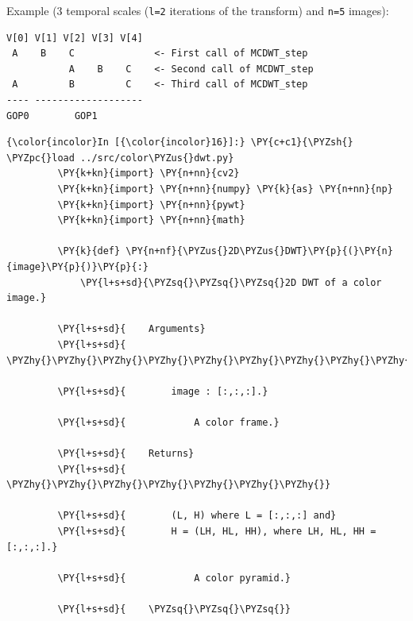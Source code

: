 Example (3 temporal scales (\texttt{l=2} iterations of the transform)
and \texttt{n=5} images):

\begin{verbatim}
V[0] V[1] V[2] V[3] V[4]
 A    B    C              <- First call of MCDWT_step
           A    B    C    <- Second call of MCDWT_step
 A         B         C    <- Third call of MCDWT_step
---- -------------------
GOP0        GOP1
\end{verbatim}

    \begin{Verbatim}[commandchars=\\\{\}]
{\color{incolor}In [{\color{incolor}16}]:} \PY{c+c1}{\PYZsh{} \PYZpc{}load ../src/color\PYZus{}dwt.py}
         \PY{k+kn}{import} \PY{n+nn}{cv2}
         \PY{k+kn}{import} \PY{n+nn}{numpy} \PY{k}{as} \PY{n+nn}{np}
         \PY{k+kn}{import} \PY{n+nn}{pywt}
         \PY{k+kn}{import} \PY{n+nn}{math}
         
         \PY{k}{def} \PY{n+nf}{\PYZus{}2D\PYZus{}DWT}\PY{p}{(}\PY{n}{image}\PY{p}{)}\PY{p}{:}
             \PY{l+s+sd}{\PYZsq{}\PYZsq{}\PYZsq{}2D DWT of a color image.}
         
         \PY{l+s+sd}{    Arguments}
         \PY{l+s+sd}{    \PYZhy{}\PYZhy{}\PYZhy{}\PYZhy{}\PYZhy{}\PYZhy{}\PYZhy{}\PYZhy{}\PYZhy{}}
         
         \PY{l+s+sd}{        image : [:,:,:].}
         
         \PY{l+s+sd}{            A color frame.}
         
         \PY{l+s+sd}{    Returns}
         \PY{l+s+sd}{    \PYZhy{}\PYZhy{}\PYZhy{}\PYZhy{}\PYZhy{}\PYZhy{}\PYZhy{}}
         
         \PY{l+s+sd}{        (L, H) where L = [:,:,:] and}
         \PY{l+s+sd}{        H = (LH, HL, HH), where LH, HL, HH = [:,:,:].}
         
         \PY{l+s+sd}{            A color pyramid.}
         
         \PY{l+s+sd}{    \PYZsq{}\PYZsq{}\PYZsq{}}
         

\end{Verbatim}
